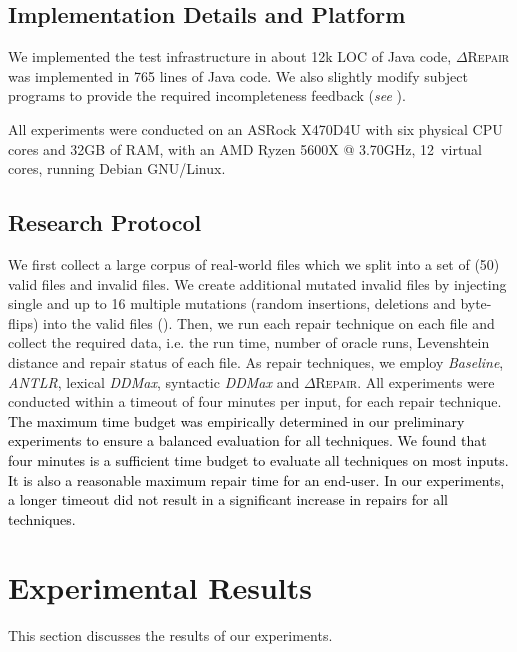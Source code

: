\documentclass[acmsmall,screen,review,anonymous]{acmart}
\newcommand{\revise}[1]{\textcolor{black}{#1}}
\newcommand{\approach}{\textsc{$\Delta$Repair}\xspace}
\newcommand{\ddmax}{\textit{DDMax}\xspace}
\begin{document}
\subsection{Implementation Details and Platform}

We implemented the test infrastructure in about 12k LOC of Java code, \approach was implemented in 765 lines of Java code.
We also slightly modify subject programs %
to provide the required incompleteness feedback (\textit{see} ).

All experiments were conducted
on an ASRock X470D4U with six physical CPU cores and 32GB of RAM, with an AMD Ryzen 5600X @ 3.70GHz, 12~virtual cores, running Debian GNU/Linux.


\subsection{Research Protocol}
We first collect a large corpus of  real-world files which we split into a set of (50) valid files and invalid files. We create additional mutated invalid files by injecting single and up to 16 multiple mutations (random insertions, deletions and byte-flips) into the valid files  
().
Then, we run each repair technique on each file and collect the required data, i.e. the run time, number of oracle runs, Levenshtein distance and repair status of each file.
As repair techniques, we employ \emph{Baseline}, %
\emph{ANTLR}, lexical \ddmax, syntactic \ddmax and \approach.
All experiments were conducted within a timeout of four minutes per input, for each repair technique. %
\revise{
The maximum time budget was empirically determined in our preliminary experiments to ensure a balanced evaluation for all techniques. We found that four minutes is a sufficient time budget to evaluate all techniques on most inputs. It is also a reasonable maximum repair time for an end-user. In our experiments, a longer timeout did not result in a significant increase in repairs for all techniques.}














\section{Experimental Results}
\label{sec:results}
This section discusses the %
results %
of our experiments. %
\end{document}
